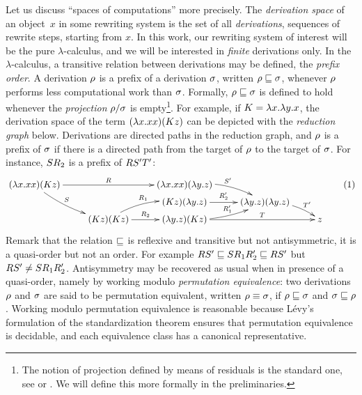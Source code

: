 Let us discuss ``spaces of computations'' more precisely.
The \emph{derivation space} of an object~$x$ in some rewriting system
is the set of all {\em derivations}, \ie sequences of rewrite steps, starting from $x$.
In this work, our rewriting system of interest will be the pure $\lambda$-calculus,
and we will be interested in \emph{finite} derivations only.
In the $\lambda$-calculus,
a transitive relation between derivations may be defined, the {\em prefix order}.
A derivation $\rho$ is a prefix of a derivation $\sigma$,
written $\rho \sqsubseteq \sigma$,
whenever $\rho$ performs less computational work than $\sigma$.
Formally, $\rho \sqsubseteq \sigma$ is defined to hold whenever the {\em projection} $\rho/\sigma$ 
is empty\footnote{The notion of projection defined by means of residuals
is the standard one, see \eg \cite[Chapter~12]{Barendregt:1984}
or \cite[Section~8.7]{Terese}.
We will define this more formally in the preliminaries.}.
For example, if $K = \lambda x. \lambda y. x$,
the derivation space of the term $(\lambda x. xx)(Kz)$
can be depicted with the \emph{reduction graph} below.
Derivations are directed paths in the reduction graph,
and $\rho$ is a prefix of $\sigma$ if there is a directed path from the
target of $\rho$ to the target of $\sigma$.
For instance, $SR_2$ is a prefix of $RS'T'$:
\[
  \xymatrix@R=.1cm{
    (\lam{\var}{\var\var})(K\varthree)
      \ar^-{\redex}[rr]
      \ar@/_.2cm/^-{\redextwo}[rdd]
  &
  &
    (\lam{\var}{\var\var})(\lam{\vartwo}{\varthree})
    \ar@/^.3cm/[rd]^{\redextwo'}
  &
  \\
  &
  &
    (K\varthree)(\lam{\vartwo}{\varthree}) \ar[r]^-{\redex'_2}
  &
    (\lam{\vartwo}{\varthree})(\lam{\vartwo}{\varthree})
    \ar@/^.2cm/[rd]^-{\redexthree'}
  \\
  &
    (K\varthree)(K\varthree) \ar@/^.3cm/[ru]^{\redex_1} \ar[r]^-{\redex_2}
  &
    (\lam{\vartwo}{\varthree})(K\varthree)
      \ar@/_.2cm/[ru]^-{\redex'_1}
      \ar[rr]^-{\redexthree}
  &
  &
    \varthree
  }
  \tag{1} \label{eq:redgraph}
\]
Remark that the relation $\sqsubseteq$ is reflexive and transitive but not antisymmetric,
\ie it is a quasi-order but not an order.
For example $RS' \sqsubseteq SR_1R_2' \sqsubseteq RS'$
but $RS' \neq  SR_1R_2'$.
Antisymmetry may be recovered as usual when in presence of a quasi-order,
namely by working modulo {\em permutation equivalence}:
two derivations $\rho$ and $\sigma$
are said to be permutation equivalent,
written $\rho \equiv \sigma$, if $\rho \sqsubseteq \sigma$
and $\sigma \sqsubseteq \rho$.
Working modulo permutation equivalence is reasonable because L\'evy's formulation
of the standardization theorem ensures that permutation equivalence is decidable,
and each equivalence class has a canonical representative.


